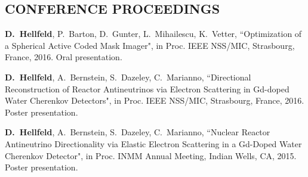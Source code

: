 \documentclass[margin, 10pt]{style/res} %
\begin{document}
\begin{resume}








\section{\small{CONFERENCE PROCEEDINGS}}

 \begin{thebibliography}{3}
 \raggedright
 \vspace{10pt}

 
  \textbf{D.~Hellfeld}, P.~Barton, D.~Gunter, L.~Mihailescu, K.~Vetter, ``Optimization of a Spherical Active Coded Mask Imager", in Proc. IEEE NSS/MIC, Strasbourg, France, 2016. Oral presentation.
 
  \textbf{D.~Hellfeld}, A.~Bernstein, S.~Dazeley, C.~Marianno, ``Directional Reconstruction of Reactor Antineutrinos via Electron Scattering in Gd-doped Water Cherenkov Detectors", in Proc. IEEE NSS/MIC, Strasbourg, France, 2016. Poster presentation.
 
  \textbf{D.~Hellfeld}, A.~Bernstein, S.~Dazeley, C.~Marianno, ``Nuclear Reactor Antineutrino Directionality via Elastic Electron Scattering in a Gd-Doped Water Cherenkov Detector", in Proc. INMM Annual Meeting, Indian Wells, CA, 2015. Poster presentation.


\end{thebibliography}
\end{resume}
\end{document}
